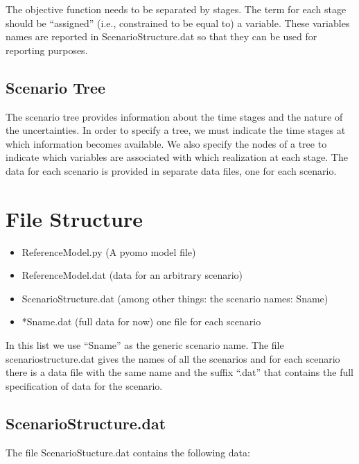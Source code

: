 The objective function needs to be separated by stages. The term for each stage should be ``assigned'' (i.e., constrained to be equal to)
a variable. These variables names are reported in ScenarioStructure.dat so that they can be used for reporting purposes.

\subsection{Scenario Tree}

The scenario tree provides information about the time stages and the nature of the uncertainties. In order to specify a tree, we must
indicate the time stages at which information becomes available. We also specify the nodes of a tree to indicate which variables
are associated with which realization at each stage. The data for each scenario is provided in separate data files, one for each scenario.

\section{File Structure}

\begin{itemize}
\item ReferenceModel.py  (A pyomo model file)
\item ReferenceModel.dat (data for an arbitrary scenario)
\item ScenarioStructure.dat (among other things: the scenario names: Sname)
\item *Sname.dat   (full data for now) one file for each scenario
\end{itemize}

In this list we use ``Sname'' as the generic scenario name. The file scenariostructure.dat gives the names of all the scenarios and for each scenario there is a data file with the same name and the suffix ``.dat'' that contains the full specification of data for the scenario.

\subsection{ScenarioStructure.dat}

The file ScenarioStucture.dat contains the following data:


